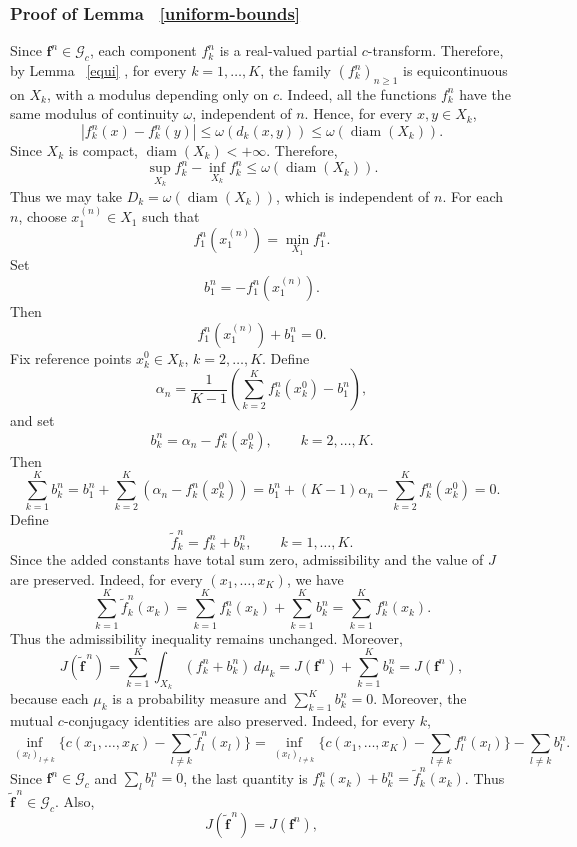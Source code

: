 \documentclass[twoside,11pt,a4paper]{article}
\newcommand*{\SavedRef}{}
\let\SavedRef\ref
\renewcommand*{\ref}[1]{  \begingroup
    \hypersetup{
      linkcolor=linkequation,
      linkbordercolor=linkequation,
    }    \SavedRef{#1}  \endgroup
}
\begin{document}
\subsubsection*{Proof of Lemma~\ref{uniform-bounds}}
Since \(\boldsymbol f^n\in\mathcal G_c\), each component \(f_k^n\) is a
real-valued partial \(c\)-transform. Therefore, by Lemma~\ref{equi}, for every
\(k=1,\ldots,K\), the family \((f_k^n)_{n\ge1}\) is equicontinuous on \(X_k\),
with a modulus depending only on \(c\). Indeed, all the functions \(f_k^n\) have the same modulus
of continuity \(\omega\), independent of \(n\). Hence, for every
\(x,y\in X_k\),
\[
|f_k^n(x)-f_k^n(y)|
\le \omega(d_k(x,y))
\le \omega(\operatorname{diam}(X_k)).
\]
Since \(X_k\) is compact, \(\operatorname{diam}(X_k)<+\infty\). Therefore,
\[
\sup_{X_k} f_k^n-\inf_{X_k} f_k^n
\le
\omega(\operatorname{diam}(X_k)).
\]
Thus we may take $
D_k=\omega(\operatorname{diam}(X_k))$,
which is independent of \(n\).
For each \(n\), choose \(x_1^{(n)}\in X_1\) such that
\[
f_1^n(x_1^{(n)})=\min_{X_1}f_1^n.
\]
Set
\[
b_1^n=-f_1^n(x_1^{(n)}).
\]
Then
\[
f_1^n(x_1^{(n)})+b_1^n=0.
\]
Fix reference points \(x_k^0\in X_k\), \(k=2,\ldots,K\). Define
\[
\alpha_n
=
\frac{1}{K-1}
\left(
\sum_{k=2}^K f_k^n(x_k^0)-b_1^n
\right),
\]
and set
\[
b_k^n=\alpha_n-f_k^n(x_k^0),
\qquad k=2,\ldots,K.
\]
Then
\[
\sum_{k=1}^K b_k^n
=
b_1^n+\sum_{k=2}^K(\alpha_n-f_k^n(x_k^0))
=
b_1^n+(K-1)\alpha_n-\sum_{k=2}^K f_k^n(x_k^0)
=0.
\]
Define
\[
\widetilde f_k^n=f_k^n+b_k^n,
\qquad k=1,\ldots,K.
\]
Since the added constants have total sum zero, admissibility and the value of
\(J\) are preserved. Indeed, for every \((x_1,\ldots,x_K)\), we have
\[
\sum_{k=1}^K \widetilde f_k^n(x_k)
=
\sum_{k=1}^K f_k^n(x_k)
+
\sum_{k=1}^K b_k^n
=
\sum_{k=1}^K f_k^n(x_k).
\]
Thus the admissibility inequality remains unchanged. Moreover,
\[
J(\widetilde{\boldsymbol f}^{\,n})
=
\sum_{k=1}^K\int_{X_k}(f_k^n+b_k^n)\,d\mu_k
=
J(\boldsymbol f^n)
+
\sum_{k=1}^K b_k^n
=
J(\boldsymbol f^n),
\]
because each \(\mu_k\) is a probability measure and
\(\sum_{k=1}^K b_k^n=0\). Moreover, the mutual \(c\)-conjugacy identities are also
preserved. Indeed, for every \(k\),
\[
\inf_{(x_l)_{l\ne k}}
\Big\{
c(x_1,\ldots,x_K)-\sum_{l\ne k}\widetilde f_l^n(x_l)
\Big\}
=
\inf_{(x_l)_{l\ne k}}
\Big\{
c(x_1,\ldots,x_K)-\sum_{l\ne k}f_l^n(x_l)
\Big\}
-\sum_{l\ne k}b_l^n.
\]
Since \(\boldsymbol f^n\in\mathcal G_c\) and \(\sum_l b_l^n=0\), the last
quantity is $
f_k^n(x_k)+b_k^n
=
\widetilde f_k^n(x_k)$.
Thus \(\widetilde{\boldsymbol f}^{\,n}\in\mathcal G_c\). Also,
\[
J(\widetilde{\boldsymbol f}^{\,n})=J(\boldsymbol f^n),
\]
\end{document}
